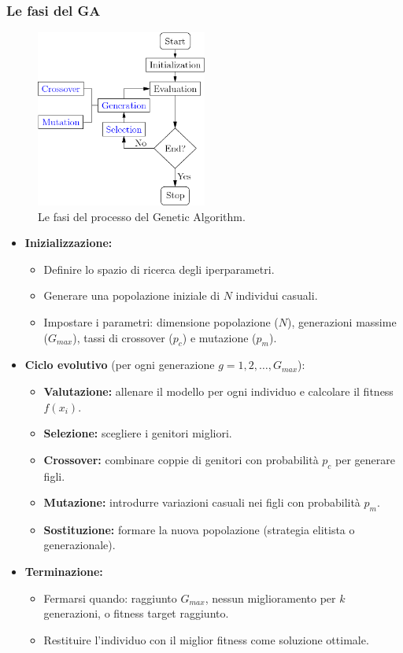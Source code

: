 \documentclass[a4paper,12pt]{report}
\begin{document}
	\subsubsection{Le fasi del GA}
	\begin{figure}[H]
		\centering
		\includegraphics[width=0.5\textwidth]{img/ga_process.png}
		\caption{Le fasi del processo del Genetic Algorithm.}
	\end{figure}
	\begin{itemize}
		\item \textbf{Inizializzazione:}
		\begin{itemize}
			\item Definire lo spazio di ricerca degli iperparametri.
			\item Generare una popolazione iniziale di $N$ individui casuali.
			\item Impostare i parametri: dimensione popolazione ($N$), generazioni massime ($G_{max}$), tassi di crossover ($p_c$) e mutazione ($p_m$).
		\end{itemize}
		
		\item \textbf{Ciclo evolutivo} (per ogni generazione $g = 1, 2, \ldots, G_{max}$):
		\begin{itemize}
			\item \textbf{Valutazione:} allenare il modello per ogni individuo e calcolare il fitness $f(x_i)$.
			\item \textbf{Selezione:} scegliere i genitori migliori.
			\item \textbf{Crossover:} combinare coppie di genitori con probabilità $p_c$ per generare figli.
			\item \textbf{Mutazione:} introdurre variazioni casuali nei figli con probabilità $p_m$.
			\item \textbf{Sostituzione:} formare la nuova popolazione (strategia elitista o generazionale).
		\end{itemize}
		
		\item \textbf{Terminazione:}
		\begin{itemize}
			\item Fermarsi quando: raggiunto $G_{max}$, nessun miglioramento per $k$ generazioni, o fitness target raggiunto.
			\item Restituire l'individuo con il miglior fitness come soluzione ottimale.
		\end{itemize}
	\end{itemize}
	
\end{document}

